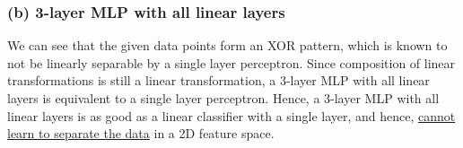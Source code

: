 \subsubsection*{(b) 3-layer MLP with all linear layers}

We can see that the given data points form an XOR pattern, which is known to not be linearly separable by a single layer perceptron.
Since composition of linear transformations is still a linear transformation, a 3-layer MLP with all linear layers is equivalent to a single layer perceptron.
Hence, a 3-layer MLP with all linear layers is as good as a linear classifier with a single layer, and hence, \underline{cannot learn to separate the data} in a 2D feature space.
